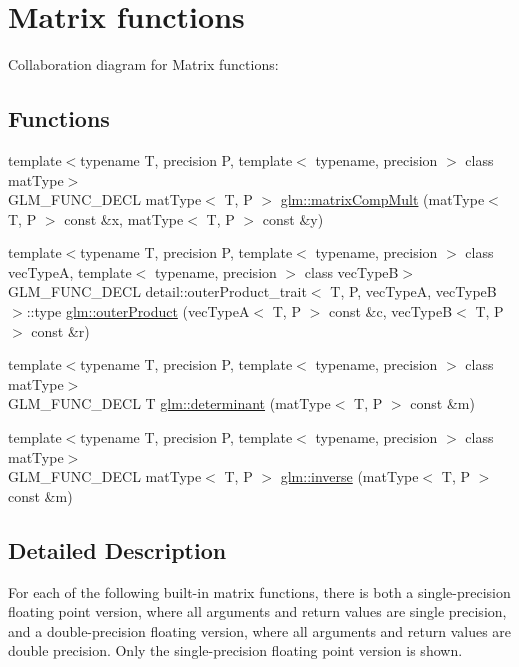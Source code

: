 \hypertarget{group__core__func__matrix}{
\section{Matrix functions}
\label{group__core__func__matrix}
}


Collaboration diagram for Matrix functions:\subsection*{Functions}
\begin{CompactItemize}
\item 
{\footnotesize template$<$typename T, precision P, template$<$ typename, precision $>$ class matType$>$ }\\GLM\_\-FUNC\_\-DECL matType$<$ T, P $>$ \hyperlink{group__core__func__matrix_g30bbe46a821497b9ae0c63a2d27db0b2}{glm::matrixCompMult} (matType$<$ T, P $>$ const \&x, matType$<$ T, P $>$ const \&y)
\item 
{\footnotesize template$<$typename T, precision P, template$<$ typename, precision $>$ class vecTypeA, template$<$ typename, precision $>$ class vecTypeB$>$ }\\GLM\_\-FUNC\_\-DECL detail::outerProduct\_\-trait$<$ T, P, vecTypeA, vecTypeB $>$::type \hyperlink{group__core__func__matrix_g47818f9809502f7a975a2c43a61fedb3}{glm::outerProduct} (vecTypeA$<$ T, P $>$ const \&c, vecTypeB$<$ T, P $>$ const \&r)
\item 
{\footnotesize template$<$typename T, precision P, template$<$ typename, precision $>$ class matType$>$ }\\GLM\_\-FUNC\_\-DECL T \hyperlink{group__core__func__matrix_g704c9bfebc2533c6715691de6473f90b}{glm::determinant} (matType$<$ T, P $>$ const \&m)
\item 
{\footnotesize template$<$typename T, precision P, template$<$ typename, precision $>$ class matType$>$ }\\GLM\_\-FUNC\_\-DECL matType$<$ T, P $>$ \hyperlink{group__core__func__matrix_g4b56decdc6560a13b616c6312bdcc17e}{glm::inverse} (matType$<$ T, P $>$ const \&m)
\end{CompactItemize}


\subsection{Detailed Description}
For each of the following built-in matrix functions, there is both a single-precision floating point version, where all arguments and return values are single precision, and a double-precision floating version, where all arguments and return values are double precision. Only the single-precision floating point version is shown. 

